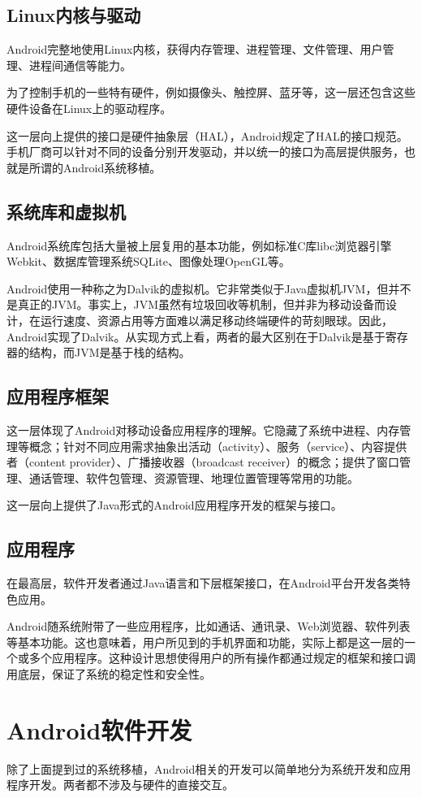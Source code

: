 \subsection{Linux内核与驱动}
Android完整地使用Linux内核，获得内存管理、进程管理、文件管理、用户管理、进程间通信等能力。

为了控制手机的一些特有硬件，例如摄像头、触控屏、蓝牙等，这一层还包含这些硬件设备在Linux上的驱动程序。

这一层向上提供的接口是硬件抽象层（HAL），Android规定了HAL的接口规范。手机厂商可以针对不同的设备分别开发驱动，并以统一的接口为高层提供服务，也就是所谓的Android系统移植。
\subsection{系统库和虚拟机}
Android系统库包括大量被上层复用的基本功能，例如标准C库libc浏览器引擎Webkit、数据库管理系统SQLite、图像处理OpenGL等。

Android使用一种称之为Dalvik的虚拟机。它非常类似于Java虚拟机JVM，但并不是真正的JVM。事实上，JVM虽然有垃圾回收等机制，但并非为移动设备而设计，在运行速度、资源占用等方面难以满足移动终端硬件的苛刻眼球。因此，Android实现了Dalvik。从实现方式上看，两者的最大区别在于Dalvik是基于寄存器的结构，而JVM是基于栈的结构。
\subsection{应用程序框架}
这一层体现了Android对移动设备应用程序的理解。它隐藏了系统中进程、内存管理等概念；针对不同应用需求抽象出活动（activity）、服务（service）、内容提供者（content provider）、广播接收器（broadcast receiver）的概念；提供了窗口管理、通话管理、软件包管理、资源管理、地理位置管理等常用的功能。

这一层向上提供了Java形式的Android应用程序开发的框架与接口。
\subsection{应用程序}
在最高层，软件开发者通过Java语言和下层框架接口，在Android平台开发各类特色应用。

Android随系统附带了一些应用程序，比如通话、通讯录、Web浏览器、软件列表等基本功能。这也意味着，用户所见到的手机界面和功能，实际上都是这一层的一个或多个应用程序。这种设计思想使得用户的所有操作都通过规定的框架和接口调用底层，保证了系统的稳定性和安全性。

\section{Android软件开发}
除了上面提到过的系统移植，Android相关的开发可以简单地分为系统开发和应用程序开发。两者都不涉及与硬件的直接交互。
